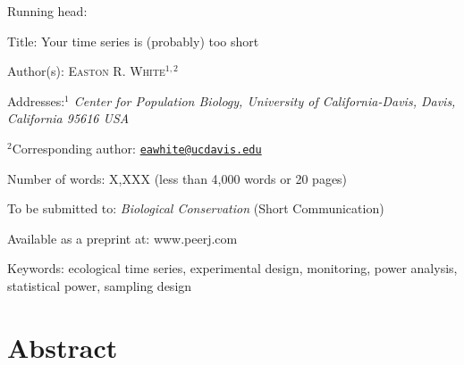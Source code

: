 \documentclass[12pt,]{article}
\title{}
\author{}
\date{}
\begin{document}
Running head: \vspace{3 mm}

Title: Your time series is (probably) too short \vspace{7 mm}

Author(s): \textsc{Easton R. White$^{1,2}$} \vspace{3 mm}

Addresses:\emph{$^1$ Center for Population Biology, University of California-Davis, Davis, California 95616 USA}
\vspace{3 mm}

\(^2\)Corresponding author:
\href{mailto:eawhite@ucdavis.edu}{\nolinkurl{eawhite@ucdavis.edu}}
\vspace{3 mm}

Number of words: X,XXX (less than 4,000 words or 20 pages) \vspace{3 mm}

To be submitted to: \emph{Biological Conservation} (Short Communication)
\vspace{3 mm}

Available as a preprint at: www.peerj.com \vspace{3 mm}

Keywords: ecological time series, experimental design, monitoring, power
analysis, statistical power, sampling design

\vspace{3 mm}

\pagebreak 

\linenumbers

\section{Abstract}\label{abstract}
\end{document}
